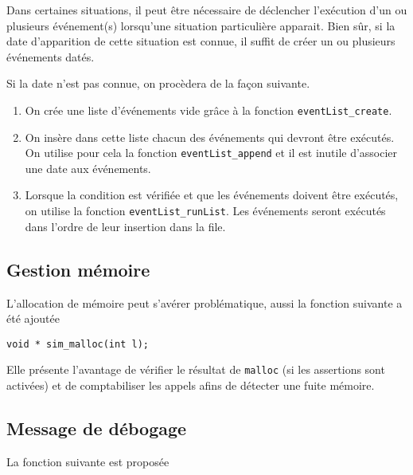    Dans certaines situations, il peut être nécessaire de déclencher
l'exécution d'un ou plusieurs événement(s) lorsqu'une situation
particulière apparait. Bien sûr, si la date d'apparition de cette
situation est connue, il suffit de créer un ou plusieurs événements
datés.

   Si la date n'est pas connue, on procèdera de la façon suivante.

\begin{enumerate}
   \item On crée une liste d'événements vide grâce à la fonction
     \lstinline!eventList_create!.
   \item On insère dans cette liste chacun des événements qui devront
     être exécutés. On utilise pour cela la fonction
     \lstinline!eventList_append! et il est inutile d'associer une date
     aux événements. 
   \item Lorsque la condition est vérifiée et que les événements
     doivent être exécutés, on utilise la fonction
     \lstinline!eventList_runList!. Les événements seront exécutés
     dans l'ordre de leur insertion dans la file.
\end{enumerate}

%
\subsection{Gestion mémoire}

   L'allocation de mémoire peut s'avérer problématique, aussi la
fonction suivante a été ajoutée

\begin{verbatim}
void * sim_malloc(int l);
\end{verbatim}

   Elle présente l'avantage de vérifier le résultat de {\tt malloc}
(si les assertions sont activées) et de comptabiliser les appels afins
de détecter une fuite mémoire.

%
\subsection{Message de débogage}

   La fonction suivante est proposée 


